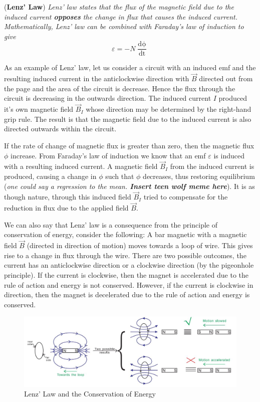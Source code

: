\begin{theorem}{(\textbf{Lenz' Law})}
\textit{Lenz' law states that the flux of the magnetic field due to the induced current \textbf{opposes} the change in flux that causes the induced current. Mathematically, Lenz' law can be combined with Faraday's law of induction to give}
\begin{equation}
    \varepsilon = -N\frac{\mathop{\mathrm{d}\phi}}{\mathop{\mathrm{d}t}}
\end{equation}
\end{theorem}

As an example of Lenz' law, let us consider a circuit with an induced emf and the resulting induced current in the anticlockwise direction with $\vec{B}$ directed out from the page and the area of the circuit is decrease. Hence the flux through the circuit is decreasing in the outwards direction. The induced current $I$ produced it's own magnetic field $\vec{B}_I$ whose direction may be determined by the right-hand grip rule. The result is that the magnetic field due to the induced current is also directed outwards within the circuit. 

If the rate of change of magnetic flux is greater than zero, then the magnetic flux $\phi$ increase. From Faraday's law of induction we know that an emf $\varepsilon$ is induced with a resulting induced current. A magnetic field $\vec{B}_I$ from the induced current is produced, causing a change in $\phi$ such that $\phi$ decreases, thus restoring equilibrium (\textit{one could say a regression to the mean. \textbf{Insert teen wolf meme here}}). It is as though nature, through this induced field $\vec{B}_I$ tried to compensate for the reduction in flux due to the applied field $\vec{B}$. 

We can also say that Lenz' law is a consequence from the principle of conservation of energy, consider the following: A bar magnetic with a magnetic field $\vec{B}$ (directed in direction of motion) moves towards a loop of wire. This gives rise to a change in flux through the wire. There are two possible outcomes, the current has an anticlockwise direction or a clockwise direction (by the pigeonhole principle). If the current is clockwise, then the magnet is accelerated due to the rule of action and energy is not conserved. However, if the current is clockwise in direction, then the magnet is decelerated due to the rule of action and energy is conserved. 

\begin{figure}[h!]
    \centering
    \includegraphics[scale=0.5]{notes/images/Lenz-1.JPG}
    \caption{Lenz' Law and the Conservation of Energy}
\end{figure}
\FloatBarrier

